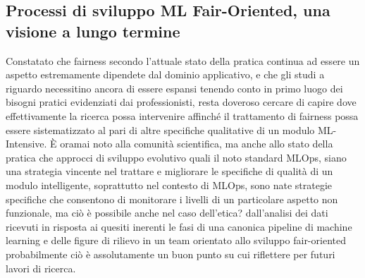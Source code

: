     \subsection{Processi di sviluppo ML Fair-Oriented, una visione a lungo termine}
    
    Constatato che fairness secondo l'attuale stato della pratica continua ad essere un aspetto estremamente dipendete dal dominio applicativo, e che gli studi a riguardo necessitino ancora di essere espansi tenendo conto in primo luogo dei bisogni pratici evidenziati dai professionisti, resta doveroso cercare di capire dove effettivamente la ricerca possa intervenire affinché il trattamento di fairness possa essere sistematizzato al pari di altre specifiche qualitative di un modulo ML-Intensive. È oramai noto alla comunità scientifica, ma anche allo stato della pratica che approcci di sviluppo evolutivo quali il noto standard MLOps, siano una strategia vincente nel trattare e migliorare le specifiche di qualità di un modulo intelligente, soprattutto nel contesto di MLOps, sono nate strategie specifiche che consentono di monitorare i livelli di un particolare aspetto non funzionale, ma ciò è possibile anche nel caso dell'etica? dall'analisi dei dati ricevuti in risposta ai quesiti inerenti le fasi di una canonica pipeline di machine learning e delle figure di rilievo in un team orientato allo sviluppo fair-oriented probabilmente ciò è assolutamente un buon punto su cui riflettere per futuri lavori di ricerca. \\
    
